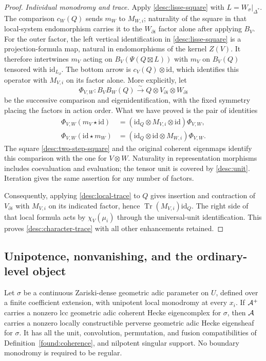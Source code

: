\begin{proof}
\emph{Individual monodromy and trace.}
Apply \eqref{desc:lisse-square} with $L=W_\sigma|_{\Delta^*}$.
The comparison $c_W(Q)$ sends $m_W$ to $M_{W,i}$; naturality of the
square in that local-system endomorphism carries it to the
$W_{\partial i}$ factor alone after applying $B_V$.
For the outer factor, the left vertical identification in
\eqref{desc:lisse-square} is a projection-formula map, natural in
endomorphisms of the kernel $Z(V)$.  It therefore intertwines
$m_V$ acting on $B_V(\Psi(Q\boxtimes L))$ with $m_V$ on $B_V(Q)$
tensored with $\mathrm{id}_{L_\partial}$.  The bottom arrow is
$c_V(Q)\otimes\mathrm{id}$, which identifies this operator with
$M_{V,i}$ on its factor alone.  More explicitly, let
\[
 \Phi_{V,W}:B_VB_W(Q)\xrightarrow{\sim}
                         Q\otimes V_{\partial i}\otimes W_{\partial i}
\]
be the successive comparison and eigenidentification, with the
fixed symmetry placing the factors in action order.  What we have
proved is the pair of identities
\begin{align*}
 \Phi_{V,W}(m_V\star\mathrm{id})
   &=(\mathrm{id}_Q\otimes M_{V,i}\otimes\mathrm{id})\Phi_{V,W},\\
 \Phi_{V,W}(\mathrm{id}\star m_W)
   &=(\mathrm{id}_Q\otimes\mathrm{id}\otimes M_{W,i})\Phi_{V,W}.
\end{align*}
The square
\eqref{desc:two-step-square} and the original coherent eigenmaps
identify this comparison with the one for $V\otimes W$.
Naturality in representation morphisms includes coevaluation and
evaluation; the tensor unit is covered by \eqref{desc:unit}.
Iteration gives the same assertion for any number of factors.

Consequently, applying \eqref{desc:local-trace} to $Q$ gives insertion
and contraction of $V_{\partial i}$ with $M_{V,i}$ on its indicated
factor, hence $\operatorname{Tr}(M_{V,i})\mathrm{id}_Q$.
The right side of that local formula acts by $\chi_V(\mu_i)$ through
the universal-unit identification.  This proves
\eqref{desc:character-trace} with all other enhancements retained.
\end{proof}

\subsection{Unipotence, nonvanishing, and the ordinary-level object}

\begin{proposition}\label{desc:ordinary}
Let $\sigma$ be a continuous Zariski-dense geometric adic parameter
on $U$, defined over a finite coefficient extension, with unipotent
local monodromy at every $x_i$.  If $\mathcal A^+$ carries a nonzero lcc
geometric adic coherent Hecke eigencomplex for $\sigma$, then $\mathcal A$
carries a nonzero locally constructible perverse geometric adic
Hecke eigensheaf for $\sigma$.  It has all the unit, convolution,
permutation, and fusion compatibilities of Definition~\ref{found:coherence},
and nilpotent singular support.  No boundary monodromy is required
to be regular.
\end{proposition}

